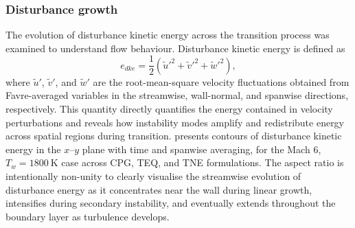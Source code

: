 
\subsubsection{Disturbance growth}

The evolution of disturbance kinetic energy across the transition process was examined to understand flow behaviour. Disturbance kinetic energy is defined as
\begin{equation}\label{equation:tke}
e_{dke} = \frac{1}{2}\left(\widetilde{u}'^2 + \widetilde{v}'^2 + \widetilde{w}'^2\right),
\end{equation}
where $\widetilde{u}'$, $\widetilde{v}'$, and $\widetilde{w}'$ are the root-mean-square velocity fluctuations obtained from Favre-averaged variables in the streamwise, wall-normal, and spanwise directions, respectively. This quantity directly quantifies the energy contained in velocity perturbations and reveals how instability modes amplify and redistribute energy across spatial regions during transition.  presents contours of disturbance kinetic energy in the $x$--$y$ plane with time and spanwise averaging, for the Mach 6, $T_w = 1800~\text{K}$ case across \gls{CPG}, \gls{TEQ}, and \gls{TNE} formulations. The aspect ratio is intentionally non-unity to clearly visualise the streamwise evolution of disturbance energy as it concentrates near the wall during linear growth, intensifies during secondary instability, and eventually extends throughout the boundary layer as turbulence develops. 

